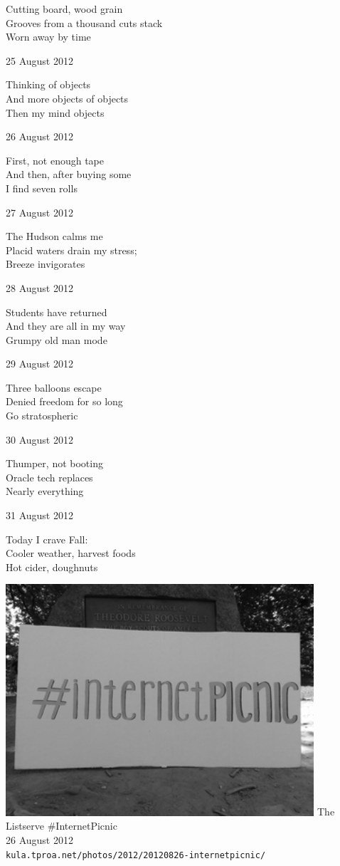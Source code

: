 \documentclass[12pt]{article}
\begin{document}
Cutting board, wood grain \\
Grooves from a thousand cuts stack \\
Worn away by time

\newpage

25 August 2012

Thinking of objects \\
And more objects of objects \\
Then my mind objects

26 August 2012

First, not enough tape \\
And then, after buying some \\
I find seven rolls

27 August 2012

The Hudson calms me \\
Placid waters drain my stress; \\
Breeze invigorates

28 August 2012

Students have returned \\
And they are all in my way \\
Grumpy old man mode

29 August 2012

Three balloons escape \\
Denied freedom for so long \\
Go stratospheric

30 August 2012

Thumper, not booting \\
Oracle tech replaces \\
Nearly everything

31 August 2012

Today I crave Fall: \\
Cooler weather, harvest foods \\
Hot cider, doughnuts

\newpage

\begin{center}
\includegraphics[width=325pt]{internetpicnic.png}
The Listserve \#InternetPicnic \\
26 August 2012 \\
{\tt kula.tproa.net/photos/2012/20120826-internetpicnic/ }

\end{center}
\end{document}
